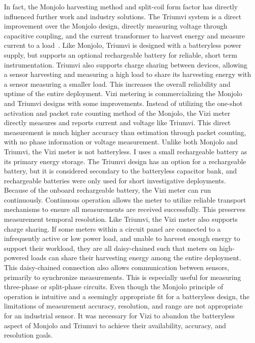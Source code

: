 In fact,
the Monjolo harvesting method and split-coil form factor has directly influenced further work and industry solutions.
The Triumvi system is a direct improvement over the Monjolo design, directly measuring voltage through capacitive coupling, and the current transformer to harvest energy and measure current to a load~\cite{campbell2018energy}.
Like Monjolo, Triumvi is designed with a batteryless power supply, but supports an optional rechargeable battery for reliable, short term instrumentation. 
Triumvi also supports charge sharing between devices, allowing a sensor harvesting and measuring a high load to share its harvesting energy with a sensor measuring a smaller load.
This increases the overall reliability and uptime of the entire deployment.
Vizi metering is commercializing the Monjolo and Triumvi designs with some improvements. 
Instead of utilizing the one-shot activation and packet rate counting method of the Monjolo, the Vizi meter directly measures and reports current and voltage like Triumvi. This direct measurement is much higher accuracy than estimation through packet counting, with no phase information or voltage measurement. 
Unlike both Monjolo and Triumvi, the Vizi meter is not batteryless. I uses a small rechargeable battery as its primary energy storage.
The Triumvi design has an option for a rechargeable battery, but it is considered secondary to the batteryless capacitor bank, and rechargeable batteries were only used for short investigative deployments.
Because of the onboard rechargeable battery, the Vizi meter can run continuously. 
Continuous operation allows the meter to utilize reliable transport mechanisms to ensure all measurements are received successfully.
This preserves measurement temporal resolution.
Like Triumvi, the Vizi meter also supports charge sharing. 
If some meters within a circuit panel are connected to a infrequently active or low power load, and unable to harvest enough energy to support their workload, they are all daisy-chained such that meters on high-powered loads can share their harvesting energy among the entire deployment.
This daisy-chained connection also allows communication between sensors, primarily to synchronize measurements. This is especially useful for measuring three-phase or split-phase circuits.
Even though the Monjolo principle of operation is intuitive and a seemingly appropriate fit for a batteryless design, the limitations of measurement accuracy, resolution, and range are not appropriate for an industrial sensor. It was necessary for Vizi to abandon the batteryless aspect of Monjolo and Triumvi to achieve their availability, accuracy, and resolution goals. 

